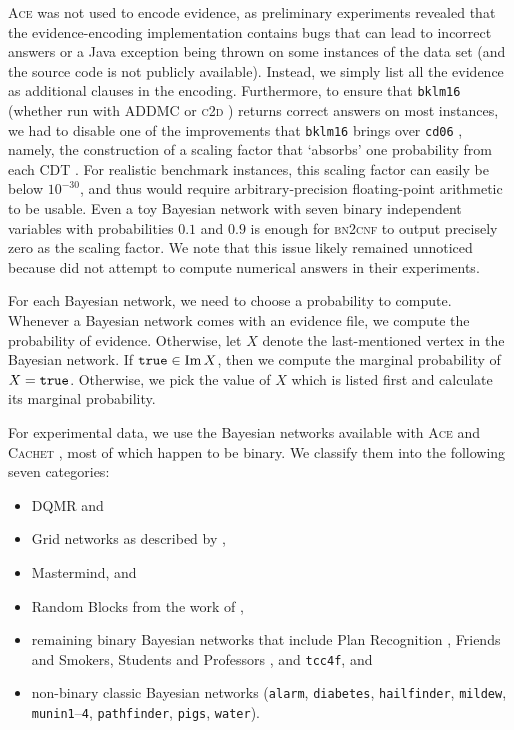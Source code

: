 \textsc{Ace} was not used to encode evidence, as preliminary experiments
revealed that the evidence-encoding implementation contains bugs that can lead
to incorrect answers or a Java exception being thrown on some instances of the
data set (and the source code is not publicly available). Instead, we simply
list all the evidence as additional clauses in the encoding. Furthermore, to
ensure that \texttt{bklm16} \citep{DBLP:conf/ecai/BartKLM16} (whether run with
\textsc{ADDMC} \citep{DBLP:conf/aaai/DudekPV20} or \textsc{c2d}
\citep{DBLP:conf/ecai/Darwiche04}) returns correct answers on most instances, we
had to disable one of the improvements that \texttt{bklm16} brings over
\texttt{cd06} \citep{DBLP:conf/sat/ChaviraD06}, namely, the construction of a
scaling factor that `absorbs' one probability from each CDT
\citep{DBLP:conf/ecai/BartKLM16}. For realistic benchmark instances, this
scaling factor can easily be below $10^{-30}$, and thus would require
arbitrary-precision floating-point arithmetic to be usable. Even a toy Bayesian
network with seven binary independent variables with probabilities $0.1$ and
$0.9$ is enough for \textsc{bn2cnf} to output precisely zero as the scaling
factor. We note that this issue likely remained unnoticed because
\citet{DBLP:conf/ecai/BartKLM16} did not attempt to compute numerical answers in
their experiments.

For each Bayesian network, we need to choose a probability to compute. Whenever
a Bayesian network comes with an evidence file, we compute the probability of
evidence. Otherwise, let $X$ denote the last-mentioned vertex in the Bayesian
network. If $\texttt{true}{} \in \operatorname{Im} X$, then we compute the marginal probability of
$X = \texttt{true}{}$. Otherwise, we pick the value of $X$ which is listed first and
calculate its marginal probability.

For experimental data, we use the Bayesian networks available with \textsc{Ace}
and \textsc{Cachet} \citep{DBLP:conf/sat/SangBBKP04}, most of which happen to be
binary. We classify them into the following seven categories:
\begin{itemize}
\item DQMR and
\item Grid networks as described by \citet{DBLP:conf/aaai/SangBK05},
\item Mastermind, and
\item Random Blocks from the work of \citet{DBLP:journals/ijar/ChaviraDJ06},
\item remaining binary Bayesian networks that include Plan Recognition
  \citep{DBLP:conf/aaai/SangBK05}, Friends and Smokers, Students and Professors
  \citep{DBLP:journals/ijar/ChaviraDJ06}, and \texttt{tcc4f}, and
\item non-binary classic Bayesian networks (\texttt{alarm}, \texttt{diabetes},
  \texttt{hailfinder}, \texttt{mildew}, \texttt{munin1}--\texttt{4},
  \texttt{pathfinder}, \texttt{pigs}, \texttt{water}).
\end{itemize}

